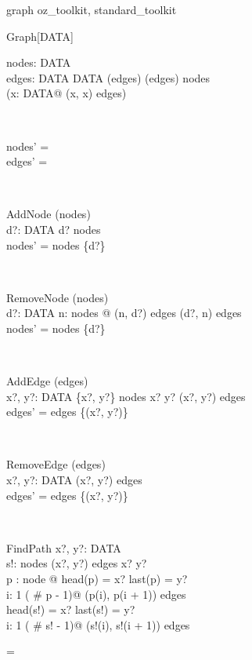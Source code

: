 \begin{zsection}
  \SECTION graph \parents oz\_toolkit, standard\_toolkit
\end{zsection}

\zedindent=2mm
\begin{class}{Graph}[DATA]
\also
\begin{state}
nodes:  \finset DATA \\ 
edges: DATA \rel DATA
\where
 \dom (edges) \cup  \ran (edges) \subseteq nodes \\ 
 \lnot (\exists x: DATA@ (x, x) \in edges)
\end{state}\\
\begin{init}
nodes' = \emptyset \\ 
edges' = \emptyset
\end{init} \\
\begin{schema}{AddNode}
\Delta(nodes)\\
d?: DATA 
\where
 d? \notin nodes \\ 
 nodes' = nodes \cup \{d?\} 
\end{schema} \\
\begin{schema}{RemoveNode}
\Delta (nodes)\\
d?: DATA 
\where
  \lnot \exists n: nodes @ (n, d?) \in edges \lor 
    (d?, n) \in edges\\ 
 nodes' = nodes \setminus \{d?\} 
\end{schema} \\
\begin{schema}{AddEdge}
\Delta (edges)\\
x?, y?: DATA 
\where
 \{x?, y?\} \subseteq nodes \land  x? \neq y? \land 
         (x?, y?) \notin edges \\ 
 edges' = edges \cup \{(x?, y?)\} 
\end{schema}\\
\begin{schema}{RemoveEdge}
\Delta (edges)\\
x?, y?: DATA 
\where
 (x?, y?) \in edges \\ 
 edges' = edges \setminus \{(x?, y?)\} \\ 
\end{schema} \\
\begin{schema}{FindPath}
x?, y?: DATA \\ 
s!:  \iseq nodes 
\where
 (x?, y?) \in edges \plus  \land x? \neq y? \land\\
       \exists p : \iseq node @ head(p) = x? \land last(p) = y? \land\\
       \forall i: 1 \upto ( \# p - 1)@ (p(i), p(i + 1)) \in edges \\ 
 head(s!) = x? \land last(s!) = y?\\ 
\forall i: 1 \upto ( \# s! - 1)@ (s!(i), s!(i + 1)) \in edges 
\end{schema} 
\end{class} 
\zedindent=\leftmargini
